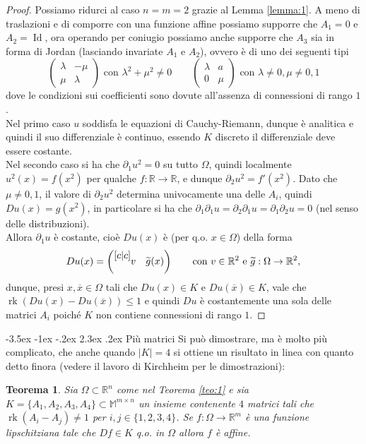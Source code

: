 \documentclass[a4paper,11pt]{book}
\makeatletter
\theoremstyle{plain}
\newtheorem{teo}{Teorema}[chapter]
\theoremstyle{definition}
\theoremstyle{remark}
\newcommand{\R}{\mathbb{R}}
\newcommand{\M}{\mathbb{M}}
\DeclareMathOperator{\Id}{Id}
\DeclareMathOperator{\rk}{rk}
\renewcommand\section{\@startsection {section}{1}{\z@}%
                                   {-3.5ex \@plus -1ex \@minus -.2ex}%
                                   {2.3ex \@plus.2ex}%
                                   {\normalfont\Large\bfseries}}
\makeatother
\begin{document}
\begin{proof}
	Possiamo ridurci al caso $n=m=2$ grazie al Lemma \ref{lemma:1}. A meno di traslazioni e di comporre con una funzione affine possiamo supporre che $A_1=0$ e $A_2=\Id$, ora operando per coniugio possiamo anche supporre che $A_3$ sia in forma di Jordan (lasciando invariate $A_1$ e $A_2$), ovvero è di uno dei seguenti tipi
	\[
		\begin{pmatrix}
			\lambda & -\mu\\
			\mu & \lambda
		\end{pmatrix}\text{ con }\lambda^2+\mu^2\neq 0\qquad
		\begin{pmatrix}
			\lambda & a\\
			0&\mu
		\end{pmatrix}\text{ con }\lambda\neq 0, \mu\neq 0,1
	\]
	dove le condizioni sui coefficienti sono dovute all'assenza di connessioni di rango $1$.\\
	Nel primo caso $u$ soddisfa le equazioni di Cauchy-Riemann, dunque è analitica e quindi il suo differenziale è continuo, essendo $K$ discreto il differenziale deve essere costante.\\
	Nel secondo caso si ha che $\partial_1u^2 = 0$ su tutto $\Omega$, quindi localmente $u^2(x) = f(x^2)$ per qualche $f:\R\to\R$, e dunque $\partial_2u^2=f'(x^2)$.	Dato che $\mu\neq 0,1$, il valore di $\partial_2u^2$ determina univocamente una delle $A_i$, quindi $Du(x) = g(x^2)$, in particolare si ha che $\partial_1\partial_1u=\partial_2\partial_1u=\partial_1\partial_2u=0$ (nel senso delle distribuzioni).\\
	Allora $\partial_1u$ è costante, cioè $Du(x)$ è (per q.o. $x\in \Omega$) della forma
	\begin{align*}
		Du(x) = \begin{pmatrix}[c|c]
			\multirow{2}{*}{$v$} & \multirow{2}{*}{$\widetilde{g}(x)$}\\
			&\\
			\end{pmatrix}\qquad \text{con }v\in \R^2\text{ e }\widetilde{g}:\Omega\to\R^2,
	\end{align*}
	dunque, presi $x,\overline{x}\in \Omega$ tali che $Du(x)\in K$ e $Du(\overline{x})\in K$, vale che $\rk(Du(x)-Du(\overline{x})) \leq 1$ e quindi $Du$ è costantemente una sola delle matrici $A_i$ poiché $K$ non contiene connessioni di rango $1$.
\end{proof}

\section{Più matrici}
Si può dimostrare, ma è molto più complicato, che anche quando $|K|=4$ si ottiene un risultato in linea con quanto detto finora (vedere il lavoro di Kirchheim \cite{kirchheim} per le dimostrazioni):
\begin{teo}
	Sia $\Omega\subset\R^{n}$ come nel Teorema \ref{teo:1} e sia $K=\{A_{1},A_{2},A_{3},A_{4}\}\subset\M^{m\times n}$ un insieme contenente $4$ matrici tali che $\rk(A_{i}-A_{j})\neq 1$ per $i,j\in\{1,2,3,4\}$. Se $f:\Omega\to\R^{m}$ è una funzione lipschitziana tale che $Df\in K$ q.o. in $\Omega$ allora $f$ è affine.
\end{teo}
\end{document}
